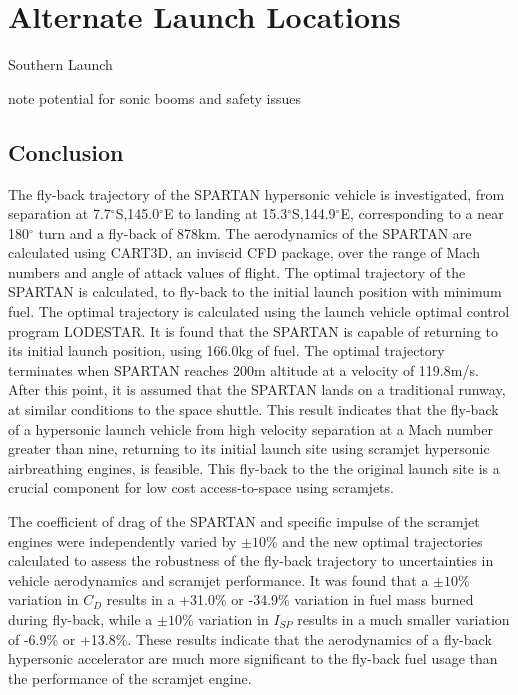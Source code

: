 \section{Alternate Launch Locations}

Southern Launch

note potential for sonic booms and safety issues




\subsection{Conclusion}
The fly-back trajectory of the SPARTAN hypersonic vehicle is investigated, from separation at 7.7$^\circ$S,145.0$^\circ$E to landing at 15.3$^\circ$S,144.9$^\circ$E, corresponding to a near 180$^\circ$ turn and a fly-back of 878km. The aerodynamics of the SPARTAN are calculated using CART3D, an inviscid CFD package, over the range of Mach numbers and angle of attack values of flight. The optimal trajectory of the SPARTAN is calculated, to fly-back to the initial launch position with minimum fuel. The optimal trajectory is calculated using the launch vehicle optimal control program LODESTAR. It is found that the SPARTAN is capable of returning to its initial launch position, using 166.0kg of fuel. The optimal trajectory terminates when SPARTAN reaches 200m altitude at a velocity of 119.8m/s. After this point, it is assumed that the SPARTAN lands on a traditional runway, at similar conditions to the space shuttle.  
This result indicates that the fly-back of a hypersonic launch vehicle from high velocity separation at a Mach number greater than nine, returning to its initial launch site using scramjet hypersonic airbreathing engines, is feasible. This fly-back to the the original launch site is a crucial component for low cost access-to-space using scramjets. 

The coefficient of drag of the SPARTAN and specific impulse of the scramjet engines were independently varied by $\pm10\%$ and the new optimal trajectories calculated to assess the robustness of the fly-back trajectory to uncertainties in vehicle aerodynamics and scramjet performance. It was found that a $\pm10\%$ variation in $C_D$ results in a +31.0\% or -34.9\% variation in fuel mass burned during fly-back, while a $\pm10\%$ variation in $I_{SP}$ results in a much smaller variation of -6.9\% or +13.8\%. These results indicate that the aerodynamics of a fly-back hypersonic accelerator are much more significant to the fly-back fuel usage than the performance of the scramjet engine. 

